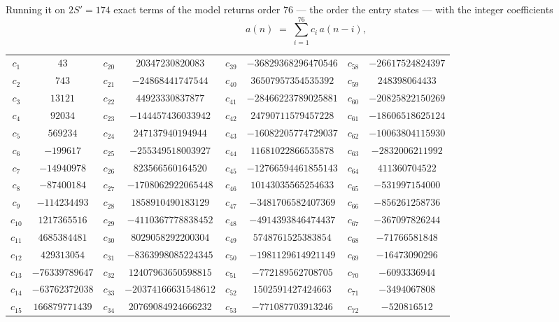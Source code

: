 \documentclass[11pt,a4paper]{article}
\theoremstyle{plain}
\theoremstyle{definition}
\begin{document}
Running it on $2S'=174$ exact terms of the model returns order $76$ --- the order the
entry states --- with the integer coefficients
\[
a(n)\;=\;\sum_{i=1}^{76}c_i\,a(n-i),
\]
\begin{center}\small
\begin{tabular}{cccccccc}
$c_{1}$ & $43$ & $c_{20}$ & $20347230820083$ & $c_{39}$ & $-36829368296470546$ & $c_{58}$ & $-26617524824397$ \\
$c_{2}$ & $743$ & $c_{21}$ & $-24868441747544$ & $c_{40}$ & $36507957354535392$ & $c_{59}$ & $248398064433$ \\
$c_{3}$ & $13121$ & $c_{22}$ & $44923330837877$ & $c_{41}$ & $-28466223789025881$ & $c_{60}$ & $-20825822150269$ \\
$c_{4}$ & $92034$ & $c_{23}$ & $-144457436033942$ & $c_{42}$ & $24790711579457228$ & $c_{61}$ & $-18606518625124$ \\
$c_{5}$ & $569234$ & $c_{24}$ & $247137940194944$ & $c_{43}$ & $-16082205774729037$ & $c_{62}$ & $-10063804115930$ \\
$c_{6}$ & $-199617$ & $c_{25}$ & $-255349518003927$ & $c_{44}$ & $11681022866535878$ & $c_{63}$ & $-2832006211992$ \\
$c_{7}$ & $-14940978$ & $c_{26}$ & $823566560164520$ & $c_{45}$ & $-12766594461855143$ & $c_{64}$ & $411360704522$ \\
$c_{8}$ & $-87400184$ & $c_{27}$ & $-1708062922065448$ & $c_{46}$ & $10143035565254633$ & $c_{65}$ & $-531997154000$ \\
$c_{9}$ & $-114234493$ & $c_{28}$ & $1858910490183129$ & $c_{47}$ & $-3481706582407369$ & $c_{66}$ & $-856261258736$ \\
$c_{10}$ & $1217365516$ & $c_{29}$ & $-4110367778838452$ & $c_{48}$ & $-4914393846474437$ & $c_{67}$ & $-367097826244$ \\
$c_{11}$ & $4685384481$ & $c_{30}$ & $8029058292200304$ & $c_{49}$ & $5748761525383854$ & $c_{68}$ & $-71766581848$ \\
$c_{12}$ & $429313054$ & $c_{31}$ & $-8363998085224345$ & $c_{50}$ & $-1981129614921149$ & $c_{69}$ & $-16473090296$ \\
$c_{13}$ & $-76339789647$ & $c_{32}$ & $12407963650598815$ & $c_{51}$ & $-772189562708705$ & $c_{70}$ & $-6093336944$ \\
$c_{14}$ & $-63762372038$ & $c_{33}$ & $-20374166631548612$ & $c_{52}$ & $1502591427424663$ & $c_{71}$ & $-3494067808$ \\
$c_{15}$ & $166879771439$ & $c_{34}$ & $20769084924666232$ & $c_{53}$ & $-771087703913246$ & $c_{72}$ & $-520816512$ \\

\end{tabular}
\end{center}
\end{document}
